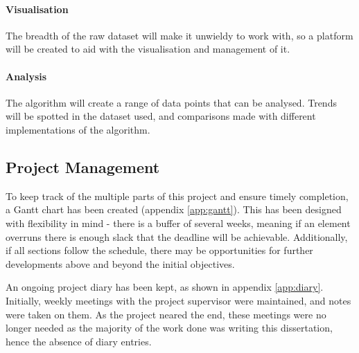 \paragraph{Visualisation}
The breadth of the raw dataset will make it unwieldy to work with, so a platform will be created to aid with the visualisation and management of it.

\paragraph{Analysis}
The algorithm will create a range of data points that can be analysed. Trends will be spotted in the dataset used, and comparisons made with different implementations of the algorithm.

\subsection{Project Management}

To keep track of the multiple parts of this project and ensure timely completion, a Gantt chart has been created (appendix \ref{app:gantt}). This has been designed with flexibility in mind - there is a buffer of several weeks, meaning if an element overruns there is enough slack that the deadline will be achievable. Additionally, if all sections follow the schedule, there may be opportunities for further developments above and beyond the initial objectives.

An ongoing project diary has been kept, as shown in appendix \ref{app:diary}. Initially, weekly meetings with the project supervisor were maintained, and notes were taken on them. As the project neared the end, these meetings were no longer needed as the majority of the work done was writing this dissertation, hence the absence of diary entries.